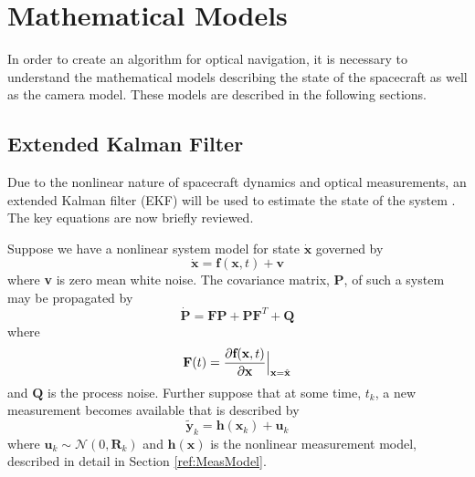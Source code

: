 \documentclass[]{aiaa-tc}%
\begin{document}

\section{Mathematical Models}
In order to create an algorithm for optical navigation, it is necessary to understand the mathematical models describing the state of the spacecraft as well as the camera model.  These models are described in the following sections.


\subsection{Extended Kalman Filter}
Due to the nonlinear nature of spacecraft dynamics and optical measurements, an extended Kalman filter (EKF) will be used to estimate the state of the system \cite{Gelb,KalmanFiltering}.  The key equations are now briefly reviewed.

Suppose we have a nonlinear system model for state $\dot{\textbf{x}}$ governed by 
%
\begin{equation}
\label{eq:F}
\dot{\textbf{x}}=\textbf{f}(\textbf{x},t)+\textbf{v}
\end{equation}
%
where \textbf{v} is zero mean white noise.  The covariance matrix, $\textbf{P}$, of such a system may be propagated by 
%
\begin{equation}
\label{eq:Pdot}
\dot{\textbf{P}}=\textbf{F}\textbf{P}+\textbf{P}\textbf{F}^T+\textbf{Q}
\end{equation}
%
where 
%
\begin{equation}
\label{eq:F}
\textbf{F}(t)=\frac{\partial{\textbf{f}(\textbf{x},t)}}{\partial{\textbf{x}}}\Big{|}_{\textbf{x}=\hat{\textbf{x}}}
\end{equation}
%
and $\textbf{Q}$ is the process noise.  Further suppose that at some time, $t_{k}$, a new measurement becomes available that is described by 
%
\begin{equation}
\label{eq:ymeas}
\tilde{\textbf{y}}_k=\textbf{h}(\textbf{x}_k)+\textbf{u}_k
\end{equation}
%
where $\textbf{u}_k \sim \mathcal{N}(0,\textbf{R}_k)$ and $\textbf{h}(\textbf{x})$ is the nonlinear measurement model, described in detail in Section \ref{ref:MeasModel}.
\end{document}
